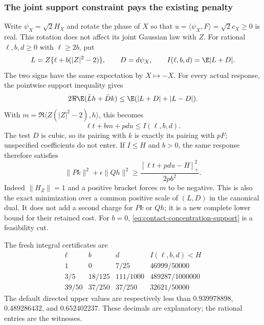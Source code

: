 \subsubsection{The joint support constraint pays the existing penalty}
Write $\psi_X=\sqrt2H_X$ and rotate the phase of $X$ so that
$u=\langle\psi_X,F\rangle=\sqrt2c_X\ge0$ is real. This rotation does
not affect its joint Gaussian law with $Z$. For rational $\ell,b,d\ge0$
with $\ell\ge2b$, put
\[
 L=Z\{\ell+b(|Z|^2-2)\},\qquad D=d\psi_X,\qquad
 I(\ell,b,d)=\E|L+D|.
\]
The two signs have the same expectation by $X\mapsto-X$.
For every actual response, the pointwise support inequality gives
\[
 2\Re\E(\bar Lh+\bar Dk)\le\E(|L+D|+|L-D|).
\]
With $m=\Re\langle Z(|Z|^2-2),h\rangle$, this becomes
\begin{equation}\label{eq:contact-concentration-support}
 \boxed{\quad \ell t+bm+pdu\le I(\ell,b,d).\quad}
\end{equation}
The test $D$ is cubic, so its pairing with $k$ is exactly its pairing
with $pF$; unspecified coefficients do not enter. If $I\le H$ and
$b>0$, the same response therefore satisfies
\begin{equation}\label{eq:contact-concentration-penalty}
 \|Pk\|^2+\epsilon\|Qh\|^2
 \ge\frac{[\ell t+pdu-H]_+^2}{2pb^2}.
\end{equation}
Indeed $\|H_Z\|=1$ and a positive bracket forces $m$ to be negative.
This is also the exact minimization over a common positive scale of
$(L,D)$ in the canonical dual. It does not add a second charge for
$Pk$ or $Qh$; it is a new complete lower bound for their retained cost.
For $b=0$, \eqref{eq:contact-concentration-support} is a feasibility cut.

The fresh integral certificates are
\[
\begin{array}{c|c|c|c}
 \ell&b&d&I(\ell,b,d)<H\\\hline
 1&0&7/25&46999/50000\\
 3/5&18/125&111/1000&489287/1000000\\
 39/50&37/250&37/250&32621/50000
\end{array}
\]
The default directed upper values are respectively less than
$0.939978898$, $0.489286432$, and $0.652402237$.
These decimals are explanatory; the rational entries are the witnesses.

